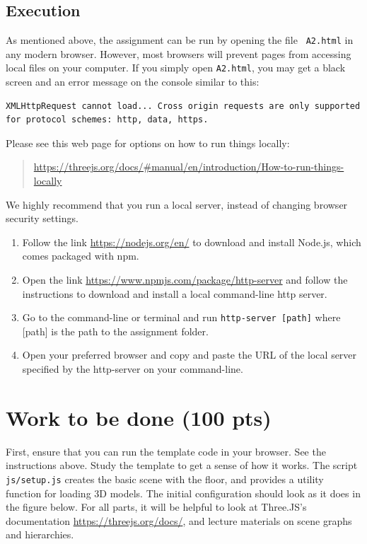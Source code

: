 \documentclass[12pt]{exam}
\begin{document}
\subsection{Execution}
As mentioned above, the assignment can be run by opening the file {\tt
  A2.html} in any modern browser. However, most browsers will prevent
pages from accessing local files on your computer. If you simply open
{\tt A2.html}, you may get a black screen and an error message on the
console similar to this:
\begin{lstlisting}[style = error]
    XMLHttpRequest cannot load... Cross origin requests are only supported for protocol schemes: http, data, https.
\end{lstlisting}

Please see this web page for options on how to run things locally:
\begin{quotation}
    {\footnotesize \url{https://threejs.org/docs/\#manual/en/introduction/How-to-run-things-locally}}
\end{quotation}

We highly recommend that you run a local server, instead of changing browser security settings.

\begin{enumerate}
    \item Follow the link \url{https://nodejs.org/en/} to download and install Node.js, which
        comes packaged with npm.
    \item Open the link \url{https://www.npmjs.com/package/http-server} and follow the
        instructions to download and install a local command-line http server.
    \item Go to the command-line or terminal and run {\tt http-server [path]}
        where [path] is the path to the assignment folder.
    \item Open your preferred browser and copy and paste the URL of the
        local server specified by the http-server on your command-line.
\end{enumerate}

\newpage

\section{Work to be done (100 pts)}

First, ensure that you can run the template code in your browser. See
the instructions above. Study the template to get a sense of how it
works. The script {\tt js/setup.js} creates the basic scene with the floor, and provides a utility function for loading 3D models. The initial configuration should look as it does in the figure below. For all parts,
it will be helpful to look at Three.JS's documentation \url{https://threejs.org/docs/}, and lecture materials on scene graphs and hierarchies.
\end{document}
